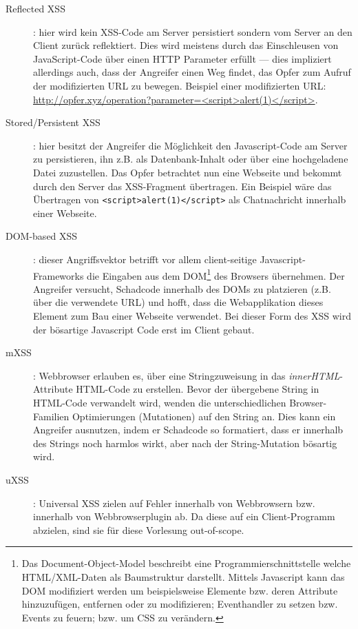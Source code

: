 \begin{description}
	\item[Reflected XSS]: hier wird kein XSS-Code am Server persistiert sondern vom Server an den Client zurück reflektiert. Dies wird meistens durch das Einschleusen von JavaScript-Code über einen HTTP Parameter erfüllt --- dies impliziert allerdings auch, dass der Angreifer einen Weg findet, das Opfer zum Aufruf der modifizierten URL zu bewegen. Beispiel einer modifizierten URL: \url{http://opfer.xyz/operation?parameter=<script>alert(1)</script>}.
	\item[Stored/Persistent XSS]: hier besitzt der Angreifer die Möglichkeit den Javascript-Code am Server zu persistieren, ihn z.B. als Datenbank-Inhalt oder über eine hochgeladene Datei zuzustellen. Das Opfer betrachtet nun eine Webseite und bekommt durch den Server das XSS-Fragment übertragen. Ein Beispiel wäre das Übertragen von \texttt{<script>alert(1)</script>} als Chatnachricht innerhalb einer Webseite.
	\item[DOM-based XSS]: dieser Angriffsvektor betrifft vor allem client-seitige Javascript-Frameworks die Eingaben aus dem DOM\footnote{Das Document-Object-Model beschreibt eine Programmierschnittstelle welche HTML/XML-Daten als Baumstruktur darstellt. Mittels Javascript kann das DOM modifiziert werden um beispielsweise Elemente bzw. deren Attribute hinzuzufügen, entfernen oder zu modifizieren; Eventhandler zu setzen bzw. Events zu feuern; bzw. um CSS zu verändern.} des Browsers übernehmen. Der Angreifer versucht, Schadcode innerhalb des DOMs zu platzieren (z.B. über die verwendete URL) und hofft, dass die Webapplikation dieses Element zum Bau einer Webseite verwendet. Bei dieser Form des XSS wird der bösartige Javascript Code erst im Client gebaut.
	\item[mXSS]: Webbrowser erlauben es, über eine Stringzuweisung in das \textit{innerHTML}-Attribute HTML-Code zu erstellen. Bevor der übergebene String in HTML-Code verwandelt wird, wenden die unterschiedlichen Browser-Familien Optimierungen (Mutationen) auf den String an. Dies kann ein Angreifer ausnutzen, indem er Schadcode so formatiert, dass er innerhalb des Strings noch harmlos wirkt, aber nach der String-Mutation bösartig wird.
	\item[uXSS]: Universal XSS zielen auf Fehler innerhalb von Webbrowsern bzw. innerhalb von Webbrowserplugin ab. Da diese auf ein Client-Programm abzielen, sind sie für diese Vorlesung out-of-scope.
\end{description}

